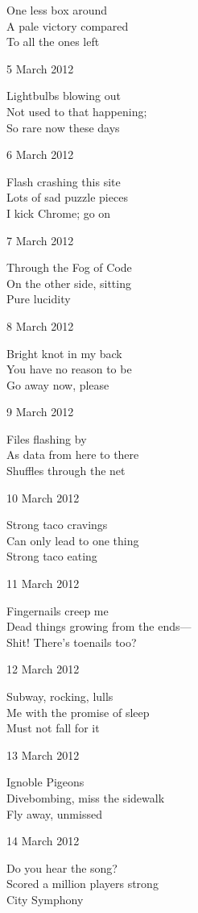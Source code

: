 \documentclass[12pt]{article}
\begin{document}
One less box around \\
A pale victory compared \\
To all the ones left

5 March 2012

Lightbulbs blowing out \\
Not used to that happening; \\
So rare now these days

6 March 2012

Flash crashing this site \\
Lots of sad puzzle pieces \\
I kick Chrome; go on

7 March 2012

Through the Fog of Code \\
On the other side, sitting \\
Pure lucidity

8 March 2012

Bright knot in my back \\
You have no reason to be \\
Go away now, please

9 March 2012

Files flashing by \\
As data from here to there \\
Shuffles through the net

10 March 2012

Strong taco cravings \\
Can only lead to one thing \\
Strong taco eating

\newpage

11 March 2012

Fingernails creep me \\
Dead things growing from the ends--- \\
Shit! There's toenails too?

12 March 2012
 
Subway, rocking, lulls \\
Me with the promise of sleep \\
Must not fall for it

13 March 2012

Ignoble Pigeons \\
Divebombing, miss the sidewalk \\
Fly away, unmissed

14 March 2012

Do you hear the song? \\
Scored a million players strong \\
City Symphony
\end{document}
